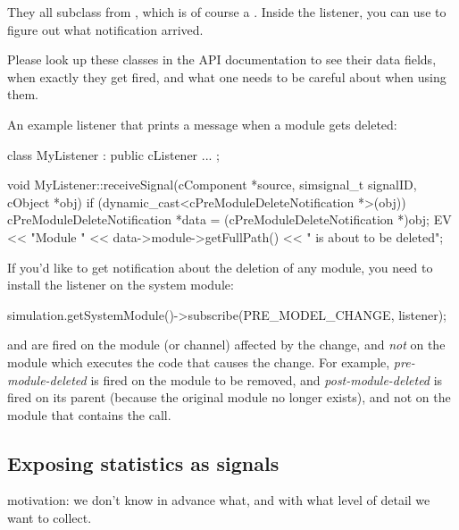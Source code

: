 \begin{note}
\begin{note}
They all subclass from , which is of course a
. Inside the listener, you can use  to figure
out what notification arrived.

\begin{note}
  Please look up these classes in the API documentation to see their data fields,
  when exactly they get fired, and what one needs to be careful about when using them.
\end{note}

An example listener that prints a message when a module gets deleted:

\begin{cpp}
class MyListener : public cListener
{
   ...
};

void MyListener::receiveSignal(cComponent *source, simsignal_t signalID, cObject *obj)
{
    if (dynamic_cast<cPreModuleDeleteNotification *>(obj))
    {
        cPreModuleDeleteNotification *data = (cPreModuleDeleteNotification *)obj;
        EV << "Module " << data->module->getFullPath() << " is about to be deleted\n";
    }
}
\end{cpp}

If you'd like to get notification about the deletion of any module, you need
to install the listener on the system module:

\begin{cpp}
simulation.getSystemModule()->subscribe(PRE_MODEL_CHANGE, listener);
\end{cpp}

\begin{note}
   and  are fired on the
  module (or channel) affected by the change, and \textit{not} on the module
  which executes the code that causes the change. For example,
  \textit{pre-module-deleted} is fired on the module to be removed, and
  \textit{post-module-deleted} is fired on its parent (because the original
  module no longer exists), and not on the module that contains the
   call.
\end{note}



\subsection{Exposing statistics as signals}

motivation: we don't know in advance what, and with what level of detail we want to collect.


\end{note}
\end{note}
